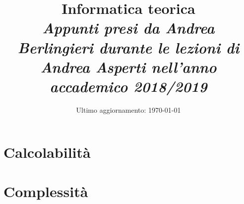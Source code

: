 \documentclass{report}
\begin{document}
\title{ Informatica teorica \\
        \normalsize \it Appunti presi da Andrea Berlingieri durante le lezioni di Andrea Asperti
        nell'anno accademico 2018/2019}
\date{Ultimo aggiornamento: \today}
\maketitle



\tableofcontents
%
\part{Calcolabilità}










\part{Complessità}





%
%
%
%
%
\end{document}

